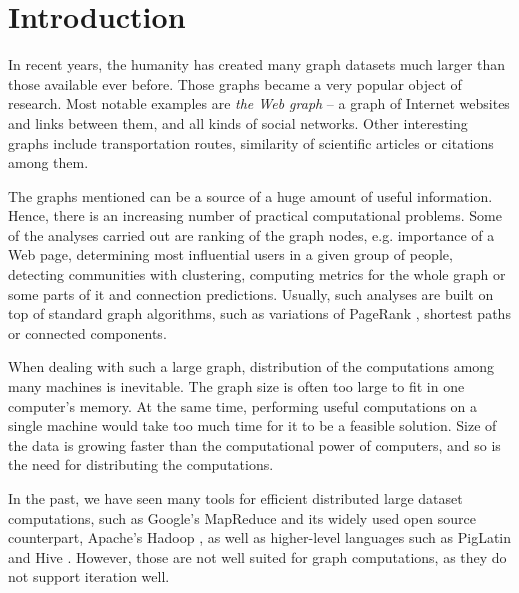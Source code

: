 
\chapter{Introduction}
In recent years, the humanity has created many graph datasets much larger than those available ever before.
Those graphs became a very popular object of research. Most notable examples are \emph{the Web graph} -- a graph of Internet websites and links between them, and all kinds of social networks. Other interesting graphs include transportation routes, similarity of scientific articles or citations among them.


The graphs mentioned can be a source of a huge amount of useful information. Hence, there is an increasing number of practical computational problems.
Some of the analyses carried out are ranking of the graph nodes, e.g. importance of a Web page, determining most influential users in a given group of people, detecting communities with clustering, computing metrics for the whole graph or some parts of it and connection predictions.
Usually, such analyses are built on top of standard graph algorithms, such as variations of PageRank \cite{pagerank}, shortest paths or connected components.

When dealing with such a large graph, distribution of the computations among many machines is inevitable. The graph size is often too large to fit in one computer's memory. At the same time, performing useful computations on a single machine would take too much time for it to be a feasible solution. Size of the data is growing faster than the computational power of computers, and so is the need for distributing the computations.

In the past, we have seen many tools for efficient distributed large dataset computations, such as Google's MapReduce \cite{mapreduce} and its widely used open source counterpart, Apache's Hadoop \cite{hadoop}, as well as higher-level languages such as PigLatin \cite{piglatin} and Hive \cite{hive}. However, those are not well suited for graph computations, as they do not support iteration well.

